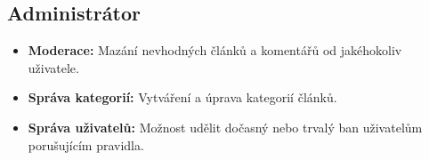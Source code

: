 \documentclass[12pt,a4paper]{article}
\begin{document}
\subsection*{Administrátor}
\begin{itemize}
    \item \textbf{Moderace:} Mazání nevhodných článků a komentářů od jakéhokoliv uživatele.
    \item \textbf{Správa kategorií:} Vytváření a úprava kategorií článků.
    \item \textbf{Správa uživatelů:} Možnost udělit dočasný nebo trvalý ban uživatelům porušujícím pravidla.
\end{itemize}
\end{document}
